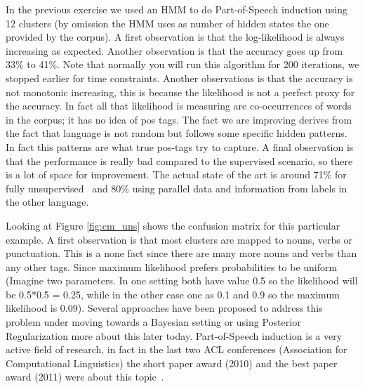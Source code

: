 In the previous exercise we used an HMM to do Part-of-Speech induction using 12 clusters (by omission the HMM uses as number of hidden states the one provided by the corpus). A first observation is that the log-likelihood is always increasing as expected. Another observation is that the accuracy goes up from 33\% to 41\%. Note that normally you will run this algorithm for 200 iterations, we stopped earlier for time constraints. Another observations is that the accuracy is not monotonic increasing, this is because the likelihood is not a perfect proxy for the accuracy. In fact all that likelihood is measuring are co-occurrences of words in the corpus; it has no idea of pos tags. The fact we are improving derives from the fact that language is not random but follows some specific hidden patterns. In fact this patterns are what true pos-tags try to capture. A final observation is that the performance is really bad compared to the supervised scenario, so there is a lot of space for improvement. The actual state of the art is around 71\% for fully unsupervised~\citep{JoaoThesis,bergkirkpatrick2010naacl} and 80\% \citep{das-petrov:2011:ACL-HLT2011} using parallel data and information from labels in the other language. 

Looking at Figure \ref{fig:cm_uns} shows the confusion matrix for this particular example. 
A first observation is that most clusters are mapped to nouns, verbs or punctuation. 
This is a none fact since there are many more nouns and verbs than any other tags. Since maximum likelihood prefers probabilities 
to be uniform (Imagine two parameters. In one setting both have value 0.5 so the likelihood will be 0.5*0.5 = 0.25, 
while in the other case one as 0.1 and 0.9 so the maximum likelihood is 0.09). Several approaches have been proposed to 
address this problem under moving towards a Bayesian setting or using 
Posterior Regularization \citep{johnson2007dtf,graca2009nips} more about this later today. 
Part-of-Speech induction is a very active field of research, in fact in the last two ACL conferences (Association for Computational Linguistics) the short paper award (2010) and the best paper award (2011) were about this topic~\citep{lamar-EtAl:2010:Short,das-petrov:2011:ACL-HLT2011}.










